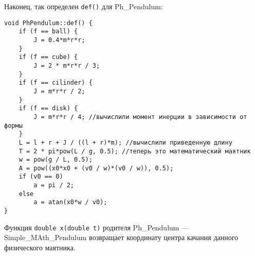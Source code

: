 \documentclass {report}
\begin{document}
Наконец, так определен \texttt{def()} для Ph\_Pendulum:
\begin{lstlisting}
void PhPendulum::def() {
	if (f == ball) {
		J = 0.4*m*r*r;
	}
	if (f == cube) {
		J = 2 * m*r*r / 3;
	}
	if (f == cilinder) {
		J = m*r*r / 2;
	}
	if (f == disk) {
		J = m*r*r / 4; //вычислили момент инерции в зависимости от формы
	}
	L = l + r + J / ((l + r)*m); //вычислили приведенную длину
	T = 2 * pi*pow(L / g, 0.5);	//теперь это математический маятник
	w = pow(g / L, 0.5);
	A = pow((x0*x0 + (v0 / w)*(v0 / w)), 0.5);
	if (v0 == 0)
		a = pi / 2;
	else
		a = atan(x0*w / v0);
}
\end{lstlisting}
Функция \texttt{double x(double t)} родителя Ph\_Pendulum --- Simple\_MAth\_Pendulum возвращает координату центра качания данного физического маятника.
\end{document}
